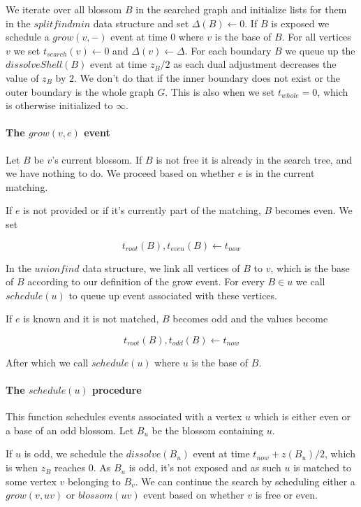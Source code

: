 We iterate over all blossom $B$ in the searched graph and initialize lists for them in the $splitfindmin$ data structure and set $\Delta(B) \gets 0$. If $B$ is exposed we schedule a $grow(v, -)$ event at time $0$ where $v$ is the base of $B$. For all vertices $v$ we set $t_{search}(v) \gets 0$ and $\Delta(v) \gets \Delta$. For each boundary $B$ we queue up the $dissolveShell(B)$ event at time $z_B / 2$ as each dual adjustment decreases the value of $z_B$ by $2$. We don't do that if the inner boundary does not exist or the outer boundary is the whole graph $G$. This is also when we set $t_{whole} = 0$, which is otherwise initialized to $\infty$.

\paragraph*{The $grow(v, e)$ event}

Let $B$ be $v$'s current blossom. If $B$ is not free it is already in the search tree, and we have nothing to do. We proceed based on whether $e$ is in the current matching.

If $e$ is not provided or if it's currently part of the matching, $B$ becomes even. We set 

\[ t_{root}(B), t_{even}(B) \gets t_{now} \]

In the $unionfind$ data structure, we link all vertices of $B$ to $v$, which is the base of $B$ according to our definition of the grow event. For every $B \in u$ we call $schedule(u)$ to queue up event associated with these vertices.

If $e$ is known and it is not matched, $B$ becomes odd and the values become

\[ t_{root}(B), t_{odd}(B) \gets t_{now} \]

After which we call $schedule(u)$ where $u$ is the base of $B$. 

\paragraph*{The $schedule(u)$ procedure}

This function schedules events associated with a vertex $u$ which is either even or a base of an odd blossom. Let $B_u$ be the blossom containing $u$. 

If $u$ is odd, we schedule the $dissolve(B_u)$ event at time $t_{now} + z(B_u) / 2$, which is when $z_B$ reaches $0$. As $B_u$ is odd, it's not exposed and as such $u$ is matched to some vertex $v$ belonging to $B_v$. We can continue the search by scheduling either a $grow(v, uv)$ or $blossom(uv)$ event based on whether $v$ is free or even.

